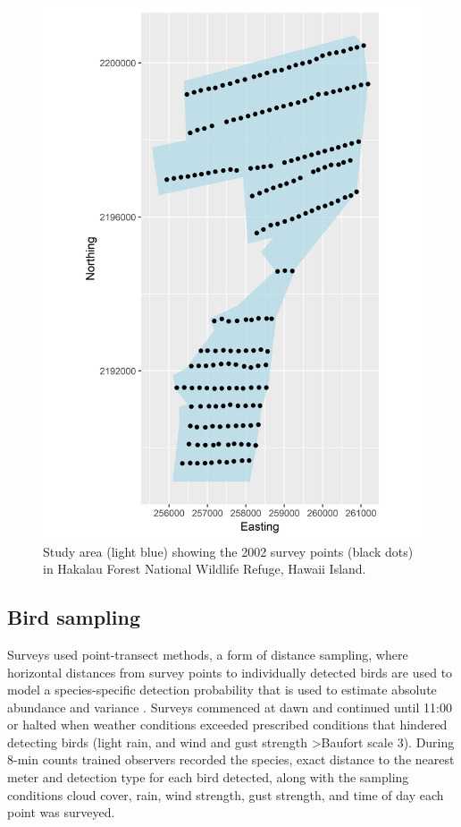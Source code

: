 \documentclass[preprint,12pt]{elsarticle}
\newcommand{\hawaii}{Hawai\textquotesingle i}   %
\begin{document}
\begin{figure}
	\centering
	\includegraphics[width=0.7\linewidth]{figures/2002studyareapoints_pt}
	\caption{Study area (light blue) showing the 2002 survey points (black dots) in Hakalau Forest National Wildlife Refuge, \hawaii{} Island.}
	\label{fig:2002studyareapointspt}
\end{figure}

\subsection*{Bird sampling}
Surveys used point-transect methods, a form of distance sampling, where horizontal distances from survey points to individually detected birds are used to model a species-specific detection probability that is used to estimate absolute abundance and variance \citep{buckland_distance_2015}. Surveys commenced at dawn and continued until 11:00 or halted when weather conditions exceeded prescribed conditions that hindered detecting birds (light rain, and wind and gust strength \textgreater Baufort scale 3). During 8-min counts trained observers recorded the species, exact distance to the nearest meter and detection type for each bird detected, along with the sampling conditions cloud cover, rain, wind strength, gust strength, and time of day each point was surveyed.
\end{document}
